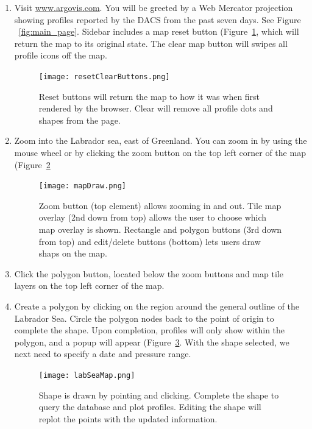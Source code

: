 \begin{enumerate}
\item Visit \url{www.argovis.com}. You will be greeted by a Web Mercator projection showing profiles reported by the DACS from the past seven days. See Figure ~\ref{fig:main_page}. Sidebar includes a map reset button (Figure~\ref{fig:reset_clear_buttons}, which will return the map to its original state. The clear map button will swipes all profile icons off the map.

\begin{figure}[H]
\begin{minipage}{6in}
\centering
\texttt{[image: resetClearButtons.png]}
\caption{\label{fig:reset_clear_buttons} Reset buttons will return the map to how it was when first rendered by the browser. Clear will remove all profile dots and shapes from the page.}
\end{minipage}
\end{figure}

\item Zoom into the Labrador sea, east of Greenland. You can zoom in by using the mouse wheel or by clicking the zoom button on the top left corner of the map (Figure~\ref{fig:map_draw}

\begin{figure}[H]
\begin{minipage}{6in}
\centering
\texttt{[image: mapDraw.png]}
\caption{\label{fig:map_draw} Zoom button (top element) allows zooming in and out. Tile map overlay (2nd down from top) allows the user to choose which map overlay is shown. Rectangle and polygon buttons (3rd down from top) and edit/delete buttons (bottom) lets users draw shaps on the map.}
\end{minipage}
\end{figure}

\item Click the polygon button, located below the zoom buttons and map tile layers on the top left corner of the map.

\item Create a polygon by clicking on the region around the general outline of the Labrador Sea. Circle the polygon nodes back to the point of origin to complete the shape. Upon completion, profiles will only show within the polygon, and a popup will appear (Figure~\ref{fig:lab_sea}. With the shape selected, we next need to specify a date and pressure range.

\begin{figure}[H]
\begin{minipage}{6in}
\centering
\texttt{[image: labSeaMap.png]}
\caption{\label{fig:lab_sea} Shape is drawn by pointing and clicking. Complete the shape to query the database and plot profiles. Editing the shape will replot the points with the updated information.}
\end{minipage}
\end{figure}


\end{enumerate}
